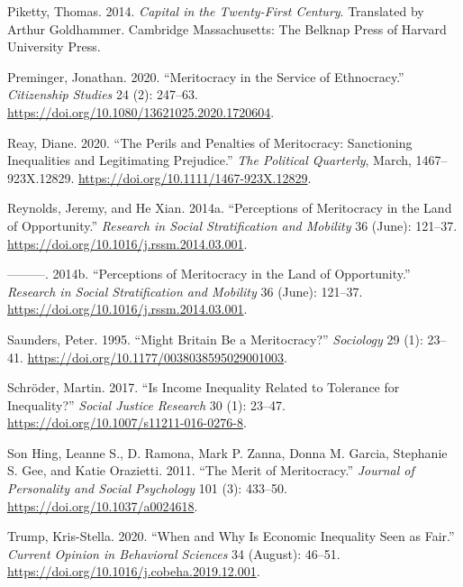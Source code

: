 \documentclass[
]{article}
\begin{document}
\leavevmode\hypertarget{ref-PikettyCapitalTwentyFirstCentury2014b}{}%
Piketty, Thomas. 2014. \emph{Capital in the Twenty-First Century}.
Translated by Arthur Goldhammer. Cambridge Massachusetts: The Belknap
Press of Harvard University Press.

\leavevmode\hypertarget{ref-PremingerMeritocracyserviceethnocracy2020}{}%
Preminger, Jonathan. 2020. ``Meritocracy in the Service of Ethnocracy.''
\emph{Citizenship Studies} 24 (2): 247--63.
\url{https://doi.org/10.1080/13621025.2020.1720604}.

\leavevmode\hypertarget{ref-ReayPerilsPenaltiesMeritocracy2020}{}%
Reay, Diane. 2020. ``The Perils and Penalties of Meritocracy:
Sanctioning Inequalities and Legitimating Prejudice.'' \emph{The
Political Quarterly}, March, 1467--923X.12829.
\url{https://doi.org/10.1111/1467-923X.12829}.

\leavevmode\hypertarget{ref-ReynoldsPerceptionsMeritocracyLand2014b}{}%
Reynolds, Jeremy, and He Xian. 2014a. ``Perceptions of Meritocracy in
the Land of Opportunity.'' \emph{Research in Social Stratification and
Mobility} 36 (June): 121--37.
\url{https://doi.org/10.1016/j.rssm.2014.03.001}.

\leavevmode\hypertarget{ref-reynolds_perceptions_2014}{}%
---------. 2014b. ``Perceptions of Meritocracy in the Land of
Opportunity.'' \emph{Research in Social Stratification and Mobility} 36
(June): 121--37. \url{https://doi.org/10.1016/j.rssm.2014.03.001}.

\leavevmode\hypertarget{ref-saundersMightBritainBe1995}{}%
Saunders, Peter. 1995. ``Might Britain Be a Meritocracy?''
\emph{Sociology} 29 (1): 23--41.
\url{https://doi.org/10.1177/0038038595029001003}.

\leavevmode\hypertarget{ref-schroder_Income_2017}{}%
Schröder, Martin. 2017. ``Is Income Inequality Related to Tolerance for
Inequality?'' \emph{Social Justice Research} 30 (1): 23--47.
\url{https://doi.org/10.1007/s11211-016-0276-8}.

\leavevmode\hypertarget{ref-son_hing_merit_2011-1}{}%
Son Hing, Leanne S., D. Ramona, Mark P. Zanna, Donna M. Garcia,
Stephanie S. Gee, and Katie Orazietti. 2011. ``The Merit of
Meritocracy.'' \emph{Journal of Personality and Social Psychology} 101
(3): 433--50. \url{https://doi.org/10.1037/a0024618}.

\leavevmode\hypertarget{ref-TrumpWhenwhyeconomic2020}{}%
Trump, Kris-Stella. 2020. ``When and Why Is Economic Inequality Seen as
Fair.'' \emph{Current Opinion in Behavioral Sciences} 34 (August):
46--51. \url{https://doi.org/10.1016/j.cobeha.2019.12.001}.
\end{document}
